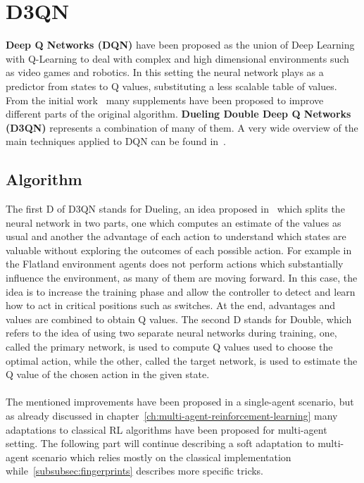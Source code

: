 \documentclass[11pt, a4paper, hidelinks]{report}
\begin{document}

\section{D3QN}\label{sec:d3qn}

\textbf{Deep Q Networks (DQN)} have been proposed as the union of Deep Learning with Q-Learning to deal with complex and high dimensional environments such as video games and robotics.
In this setting the neural network plays as a predictor from states to Q values, substituting a less scalable table of values.
From the initial work~\citep{dqn} many supplements have been proposed to improve different parts of the original algorithm.
\textbf{Dueling Double Deep Q Networks (D3QN)} represents a combination of many of them.
A very wide overview of the main techniques applied to DQN can be found in~\citep{human-level}.

\subsection{Algorithm}\label{subsec:algorithm2}

The first D of D3QN stands for Dueling, an idea proposed in~\citep{dueling} which splits the neural network in two parts, one which computes an estimate of the values as usual and another the advantage of each action to understand which states are valuable without exploring the outcomes of each possible action.
For example in the Flatland environment agents does not perform actions which substantially influence the environment, as many of them are moving forward.
In this case, the idea is to increase the training phase and allow the controller to detect and learn how to act in critical positions such as switches.
At the end, advantages and values are combined to obtain Q values.
The second D stands for Double, which refers to the idea of using two separate neural networks during training, one, called the primary network, is used to compute Q values used to choose the optimal action, while the other, called the target network, is used to estimate the Q value of the chosen action in the given state.
\\
\\
The mentioned improvements have been proposed in a single-agent scenario, but as already discussed in chapter~\ref{ch:multi-agent-reinforcement-learning} many adaptations to classical RL algorithms have been proposed for multi-agent setting.
The following part will continue describing a soft adaptation to multi-agent scenario which relies mostly on the classical implementation while~\ref{subsubsec:fingerprints} describes more specific tricks.
\end{document}
